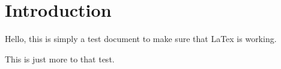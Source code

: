 \documentclass[20pt]{article}
\begin{document}
\section{Introduction}
Hello, this is simply a test document to make sure that LaTex is working.

This is just more to that test.
\end{document}
